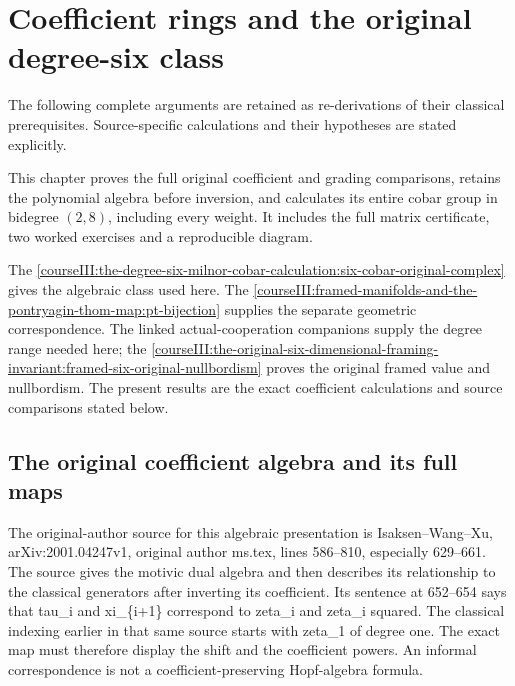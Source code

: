 \section{Coefficient rings and the original degree-six class}\label{courseIII:coefficient-rings-and-the-original-degree-six-class:section}

The following complete arguments are retained as re-derivations of their classical prerequisites. Source-specific calculations and their hypotheses are stated explicitly.

This chapter proves the full original coefficient and grading comparisons, retains the polynomial algebra before inversion, and calculates its entire cobar group in bidegree \((2,8)\), including every weight. It includes the full matrix certificate, two worked exercises and a reproducible diagram.

The \cref{courseIII:the-degree-six-milnor-cobar-calculation:six-cobar-original-complex} gives the algebraic class used here. The \cref{courseIII:framed-manifolds-and-the-pontryagin-thom-map:pt-bijection} supplies the separate geometric correspondence. The linked actual-cooperation companions supply the degree range needed here; the \cref{courseIII:the-original-six-dimensional-framing-invariant:framed-six-original-nullbordism} proves the original framed value and nullbordism. The present results are the exact coefficient calculations and source comparisons stated below.

\label{courseIII:coefficient-rings-and-the-original-degree-six-class:coefficient-original-algebras}

\subsection{The original coefficient algebra and its full maps}
\label{courseIII:coefficient-rings-and-the-original-degree-six-class:section-1}

\label{courseIII:coefficient-rings:1}

The original-author source for this algebraic presentation is Isaksen--Wang--Xu, arXiv:2001.04247v1, original author ms.tex, lines 586--810, especially 629--661. The source gives the motivic dual algebra and then describes its relationship to the classical generators after inverting its coefficient. Its sentence at 652--654 says that tau\_i and xi\_\{i+1\} correspond to zeta\_i and zeta\_i squared. The classical indexing earlier in that same source starts with zeta\_1 of degree one. The exact map must therefore display the shift and the coefficient powers. An informal correspondence is not a coefficient-preserving Hopf-algebra formula.

